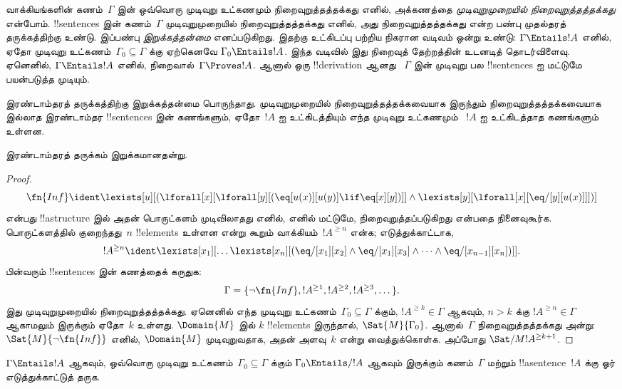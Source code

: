 \documentclass[../../../include/open-logic-section]{subfiles}
\begin{document}



\begin{explain}
வாக்கியங்களின் கணம்~$\Gamma$ இன் ஒவ்வொரு முடிவுறு உட்கணமும்
நிறைவுறுத்தத்தக்கது எனில், அக்கணத்தை
\emph{முடிவுறுமுறையில் நிறைவுறுத்தத்தக்கது} என்போம். !!{sentence}s
இன் கணம்~$\Gamma$ முடிவுறுமுறையில் நிறைவுறுத்தத்தக்கது எனில், அது
நிறைவுறுத்தத்தக்கது என்ற பண்பு முதல்தரத் தருக்கத்திற்கு உண்டு.
இப்பண்பு \emph{இறுக்கத்தன்மை} எனப்படுகிறது. இதற்கு உட்கிடப்பு
பற்றிய நிகரான வடிவம் ஒன்று உண்டு: $\Gamma \Entails !A$ எனில்,
ஏதோ முடிவுறு உட்கணம்~$\Gamma_0 \subseteq \Gamma$ க்கு ஏற்கெனவே
$\Gamma_0 \Entails !A$. இந்த வடிவில் இது நிறைவுத் தேற்றத்தின்
உடனடித் தொடர்விளைவு. ஏனெனில், $\Gamma \Entails !A$ எனில்,
நிறைவால்~$\Gamma \Proves !A$. ஆனால் ஒரு !!{derivation} ஆனது
~$\Gamma$ இன் முடிவுறு பல !!{sentence}s ஐ மட்டுமே பயன்படுத்த
முடியும்.

இரண்டாம்தரத் தருக்கத்திற்கு இறுக்கத்தன்மை பொருந்தாது.
முடிவுறுமுறையில் நிறைவுறுத்தத்தக்கவையாக இருந்தும்
நிறைவுறுத்தத்தக்கவையாக இல்லாத இரண்டாம்தர !!{sentence}s இன்
கணங்களும், ஏதோ~$!A$ ஐ உட்கிடத்தியும் எந்த முடிவுறு உட்கணமும்
~$!A$ ஐ உட்கிடத்தாத கணங்களும் உள்ளன.
\end{explain}

\begin{thm}
இரண்டாம்தரத் தருக்கம் இறுக்கமானதன்று.
\end{thm}

\begin{proof}
\[
\fn{Inf} \ident \lexists[u][(\lforall[x][\lforall[y][(\eq[u(x)][u(y)]
      \lif \eq[x][y])]] \land \lexists[y][\lforall[x][\eq/[y][u(x)]]])]
\]
என்பது !!a{structure} இல் அதன் பொருட்களம் முடிவிலாதது எனில்,
எனில் மட்டுமே, நிறைவுறுத்தப்படுகிறது என்பதை நினைவுகூர்க.
பொருட்களத்தில் குறைந்தது~$n$ !!{element}s உள்ளன என்று கூறும்
வாக்கியம்~$!A^{\ge n}$ என்க; எடுத்துக்காட்டாக,
\[
!A^{\ge n} \ident \lexists[x_1][\dots\lexists[x_n][(\eq/[x_1][x_2]
    \land \eq/[x_1][x_3] \land \dots \land \eq/[x_{n-1}][x_n])]].
\]
பின்வரும் !!{sentence}s இன் கணத்தைக் கருதுக:
\[
\Gamma = \{\lnot \fn{Inf}, !A^{\ge 1}, !A^{\ge 2}, !A^{\ge 3}, \dots\}.
\]
இது முடிவுறுமுறையில் நிறைவுறுத்தத்தக்கது. ஏனெனில் எந்த முடிவுறு
உட்கணம்~$\Gamma_0 \subseteq \Gamma$ க்கும்,
$!A^{\ge k} \in \Gamma$ ஆகவும், $n>k$ க்கு
$!A^{\ge n} \in \Gamma$ ஆகாமலும் இருக்கும் ஏதோ~$k$ உள்ளது.
$\Domain{M}$ இல் $k$ !!{element}s இருந்தால்,
$\Sat{M}{\Gamma_0}$. ஆனால்~$\Gamma$ நிறைவுறுத்தத்தக்கது அன்று:
$\Sat{M}{\lnot \fn{Inf}}$ எனில், $\Domain{M}$ முடிவுறுவதாக, அதன்
அளவு~$k$ என்று வைத்துக்கொள்க. அப்போது
$\Sat/{M}{!A^{\ge k+1}}$.
\end{proof}

\begin{prob}
$\Gamma \Entails !A$ ஆகவும், ஒவ்வொரு முடிவுறு
உட்கணம்~$\Gamma_0 \subseteq \Gamma$ க்கும்
$\Gamma_0 \Entails/ !A$ ஆகவும் இருக்கும் கணம்~$\Gamma$ மற்றும்
!!a{sentence}~$!A$ க்கு ஓர் எடுத்துக்காட்டுத் தருக.
\end{prob}
\end{document}
